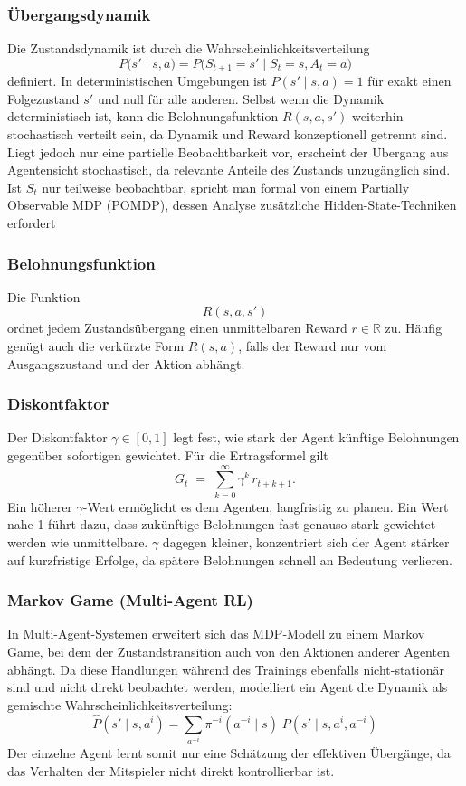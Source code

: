 \subsubsection*{Übergangsdynamik}
\vspace{-1em}
Die Zustandsdynamik ist durch die Wahrscheinlichkeitsverteilung
\[
P\bigl(s'\mid s,a\bigr)
=P\bigl(S_{t+1}=s'\mid S_t=s,A_t=a\bigr)
\]
definiert. In deterministischen Umgebungen ist \(P(s' \mid s, a) = 1\) für
exakt einen Folgezustand \(s'\) und null für alle anderen.
Selbst wenn die Dynamik deterministisch ist, kann die
Belohnungsfunktion \(R(s,a,s')\) weiterhin stochastisch verteilt sein, da Dynamik
und Reward konzeptionell getrennt sind. Liegt jedoch nur eine partielle Beobachtbarkeit vor, erscheint der Übergang aus Agentensicht stochastisch, da relevante Anteile des Zustands unzugänglich sind. Ist \(S_t\) nur teilweise beobachtbar, spricht man formal von einem Partially Observable MDP (POMDP), dessen Analyse zusätzliche Hidden-State-Techniken erfordert

\subsubsection*{Belohnungsfunktion}
\vspace{-1em}
Die Funktion
\[
R(s, a, s')
\]
ordnet jedem Zustandsübergang einen unmittelbaren Reward \(r \in \mathbb{R}\) zu. Häufig genügt auch die verkürzte Form \(R(s, a)\), falls der Reward nur vom Ausgangszustand und der Aktion abhängt.
\subsubsection*{Diskontfaktor}
\vspace{-0.8em}
Der Diskontfaktor \(\gamma \in [0,1]\) legt fest, wie stark der Agent künftige
Belohnungen gegenüber sofortigen gewichtet. Für die Ertragsformel gilt
\[
G_t \;=\; \sum_{k=0}^{\infty} \gamma^{k}\, r_{t+k+1}.
\]
Ein höherer \(\gamma\)-Wert ermöglicht es dem Agenten, langfristig zu planen. Ein Wert nahe 1 führt dazu, dass zukünftige Belohnungen fast genauso stark gewichtet werden wie unmittelbare. \(\gamma\) dagegen kleiner, konzentriert sich der Agent stärker auf kurzfristige Erfolge, da spätere Belohnungen schnell an Bedeutung verlieren.

\subsubsection*{Markov Game (Multi-Agent RL)}
\vspace{-1em}
In Multi-Agent-Systemen erweitert sich das MDP-Modell zu einem Markov Game, bei dem der Zustandstransition auch von den Aktionen anderer Agenten abhängt. Da diese Handlungen während des Trainings ebenfalls nicht-stationär sind und nicht direkt beobachtet werden, modelliert ein Agent die Dynamik als gemischte Wahrscheinlichkeitsverteilung:
\[
\hat{P}(s' \mid s, a^i)
=
\sum_{a^{-i}} \pi^{-i}(a^{-i} \mid s)\; P(s' \mid s, a^i, a^{-i})
\]
Der einzelne Agent lernt somit nur eine Schätzung der effektiven Übergänge, da das Verhalten der Mitspieler nicht direkt kontrollierbar ist.
\newpage
